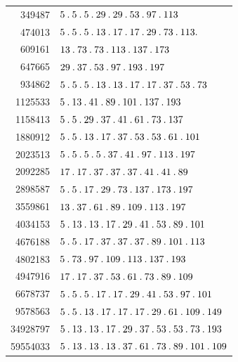 %
\begingroup\small\setlength{\tabcolsep}{5pt}
\begin{longtable}{@{}r|l@{}}
349487 & $5\pdot 5\pdot 5\pdot 29\pdot 29\pdot 53\pdot 97\pdot 113$\\
474013 & $5\pdot 5\pdot 5\pdot 13\pdot 17\pdot 17\pdot 29\pdot 73\pdot 113\pdot $\\
609161 & $13\pdot 73\pdot 73\pdot 113\pdot 137\pdot 173$\\
647665 & $29\pdot 37\pdot 53\pdot 97\pdot 193\pdot 197$\\
934862 & $5\pdot 5\pdot 5\pdot 13\pdot 13\pdot 17\pdot 17\pdot 37\pdot 53\pdot 73$\\
1125533 & $5\pdot 13\pdot 41\pdot 89\pdot 101\pdot 137\pdot 193$\\
1158413 & $5\pdot 5\pdot 29\pdot 37\pdot 41\pdot 61\pdot 73\pdot 137$\\
1880912 & $5\pdot 5\pdot 13\pdot 17\pdot 37\pdot 53\pdot 53\pdot 61\pdot 101$\\
2023513 & $5\pdot 5\pdot 5\pdot 5\pdot 37\pdot 41\pdot 97\pdot 113\pdot 197$\\
2092285 & $17\pdot 17\pdot 37\pdot 37\pdot 37\pdot 41\pdot 41\pdot 89$\\
2898587 & $5\pdot 5\pdot 17\pdot 29\pdot 73\pdot 137\pdot 173\pdot 197$\\
3559861 & $13\pdot 37\pdot 61\pdot 89\pdot 109\pdot 113\pdot 197$\\
4034153 & $5\pdot 13\pdot 13\pdot 17\pdot 29\pdot 41\pdot 53\pdot 89\pdot 101$\\
4676188 & $5\pdot 5\pdot 17\pdot 37\pdot 37\pdot 37\pdot 89\pdot 101\pdot 113$\\
4802183 & $5\pdot 73\pdot 97\pdot 109\pdot 113\pdot 137\pdot 193$\\
4947916 & $17\pdot 17\pdot 37\pdot 53\pdot 61\pdot 73\pdot 89\pdot 109$\\
6678737 & $5\pdot 5\pdot 5\pdot 17\pdot 17\pdot 29\pdot 41\pdot 53\pdot 97\pdot 101$\\
9578563 & $5\pdot 5\pdot 13\pdot 17\pdot 17\pdot 17\pdot 29\pdot 61\pdot 109\pdot 149$\\
34928797 & $5\pdot 13\pdot 13\pdot 17\pdot 29\pdot 37\pdot 53\pdot 53\pdot 73\pdot 193$\\
59554033 & $5\pdot 13\pdot 13\pdot 13\pdot 37\pdot 61\pdot 73\pdot 89\pdot 101\pdot 109$\\
\end{longtable}\endgroup
